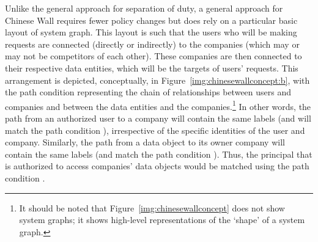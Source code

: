 \documentclass{article}
\begin{document}
Unlike the general approach for separation of duty, a general approach for Chinese Wall requires fewer policy changes but does rely on a particular basic layout of system graph.
This layout is such that the users who will be making requests are connected (directly or indirectly) to the companies (which may or may not be competitors of each other).
These companies are then connected to their respective data entities, which will be the targets of users' requests.
This arrangement is depicted, conceptually, in Figure~\ref{img:chinesewallconcept:b}, with the path condition  representing the chain of relationships between users and companies and  between the data entities and the companies.\footnote{It should be noted that Figure~\ref{img:chinesewallconcept} does not show system graphs; it shows high-level representations of the `shape' of a system graph.}
In other words, the path from an authorized user to a company will contain the same labels (and will match the path condition ), irrespective of the specific identities of the user and company.
Similarly, the path from a data object to its owner company will contain the same labels (and match the path condition ).
Thus, the principal that is authorized to access companies' data objects would be matched using the path condition .
\end{document}
